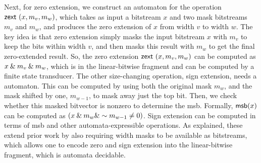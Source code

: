 Next, for zero extension, we construct an automaton for the operation $\mathsf{zext}~(x, m_v, m_w)$,
which takes as input a bitstream $x$ and two mask bitstreams $m_v$ and $m_w$,
and produces the zero extension of $x$ from width $v$ to width $w$.
The key idea is that zero extension simply masks the input bitstream $x$ with $m_v$ to keep the bits within width $v$,
and then masks this result with $m_w$ to get the final zero-extended result.
So, the zero extension $\mathsf{zext}~(x, m_v, m_w)$ can be computed as $x \mathbin{\&} m_v \mathbin{\&} m_w$,
which is in the linear-bitwise fragment and can be computed by a finite state transducer.
The other size-changing operation, sign extension, needs a \msb{} automaton.
This can be computed by using both the original mask $m_w$, and the mask shifted by one, $m_{w-1}$,
to mask away just the top bit. Then, we check whether this masked bitvector is nonzero to determine the msb.
Formally, $\mathsf{msb}(x)$ can be computed as $(x \mathbin{\&} m_w \mathbin{\&} \sim  m_{w-1} \neq 0)$.
Sign extension can be computed in terms of msb and other automata-expressible operations.
As explained, these extend prior work by also requiring width masks to be available as bitstreams,
which allows one to encode zero and sign extension into the linear-bitwise fragment, which is automata decidable.


